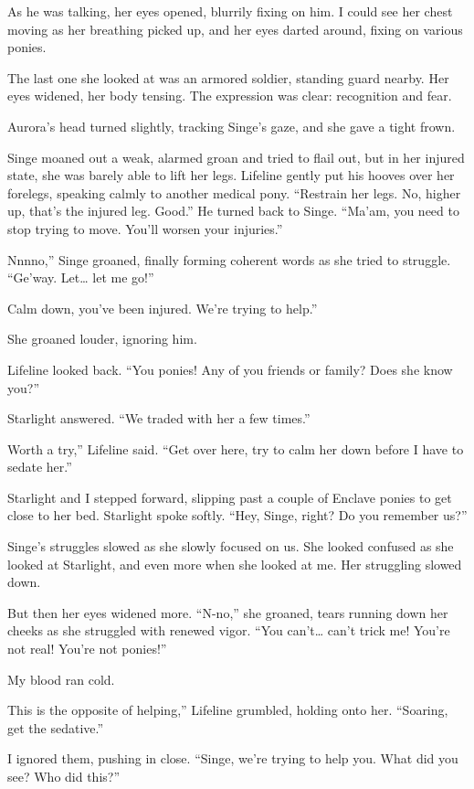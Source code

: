 As he was talking, her eyes opened, blurrily fixing on him. I could see her chest moving as her breathing picked up, and her eyes darted around, fixing on various ponies.

The last one she looked at was an armored soldier, standing guard nearby. Her eyes widened, her body tensing. The expression was clear: recognition and fear.

Aurora’s head turned slightly, tracking Singe’s gaze, and she gave a tight frown.

Singe moaned out a weak, alarmed groan and tried to flail out, but in her injured state, she was barely able to lift her legs. Lifeline gently put his hooves over her forelegs, speaking calmly to another medical pony. “Restrain her legs. No, higher up, that’s the injured leg. Good.” He turned back to Singe. “Ma’am, you need to stop trying to move. You’ll worsen your injuries.”

\leavevmode{}Nnnno,” Singe groaned, finally forming coherent words as she tried to struggle. “Ge’way. Let… let me go!”

\leavevmode{}Calm down, you’ve been injured. We’re trying to help.”

She groaned louder, ignoring him.

Lifeline looked back. “You ponies! Any of you friends or family? Does she know you?”

Starlight answered. “We traded with her a few times.”

\leavevmode{}Worth a try,” Lifeline said. “Get over here, try to calm her down before I have to sedate her.”

Starlight and I stepped forward, slipping past a couple of Enclave ponies to get close to her bed. Starlight spoke softly. “Hey, Singe, right? Do you remember us?”

Singe’s struggles slowed as she slowly focused on us. She looked confused as she looked at Starlight, and even more when she looked at me. Her struggling slowed down.

But then her eyes widened more. “N-no,” she groaned, tears running down her cheeks as she struggled with renewed vigor. “You can’t… can’t trick me! You’re not real! You’re not ponies!”

My blood ran cold.

\leavevmode{}This is the opposite of helping,” Lifeline grumbled, holding onto her. “Soaring, get the sedative.”

I ignored them, pushing in close. “Singe, we’re trying to help you. What did you see? Who did this?”


